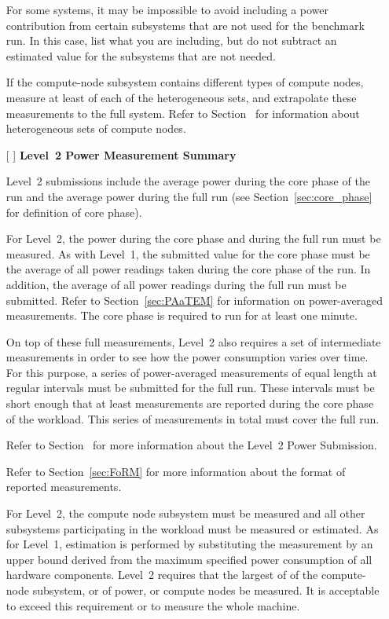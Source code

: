 \begin{itemize}
For some systems, it may be impossible to avoid including a power contribution from certain subsystems that are not used for the benchmark run.
In this case, list what you are including, but do not subtract an estimated value for the subsystems that are not needed.

If the compute-node subsystem contains different types of compute nodes, measure at least \SpecFracMinLOne{} of each of the heterogeneous sets, and extrapolate these measurements to the full system.
Refer to Section~ for information about heterogeneous sets of compute nodes.

\item[{[ ]}]
\textbf{Level~2 Power Measurement Summary}

Level~2 submissions include the average power during the core phase of the run and the average power during the full run (see Section~\ref{sec:core_phase} for definition of core phase).

For Level~2, the power during the core phase and during the full run must be measured.
As with Level~1, the submitted value for the core phase must be the average of all power readings taken during the core phase of the run.
In addition, the average of all power readings during the full run must be submitted.
Refer to Section~\ref{sec:PAaTEM} for information on power-averaged measurements.
The core phase is required to run for at least one minute.

On top of these full measurements, Level~2 also requires a set of intermediate measurements in order to see how the power consumption varies over time.
For this purpose, a series of power-averaged measurements of equal length at regular intervals must be submitted for the full run.
These intervals must be short enough that at least \MinMeasurementsCorePhaseLTwoThree{} measurements are reported during the core phase of the workload.
This series of measurements in total must cover the full run.

Refer to Section~ for more information about the Level~2 Power Submission.

Refer to Section~\ref{sec:FoRM} for more information about the format of reported measurements.

For Level~2, the compute node subsystem must be measured and all other subsystems participating in the workload must be measured or estimated.
As for Level~1, estimation is performed by substituting the measurement by an upper bound derived from the maximum specified power consumption of all hardware components.
Level~2 requires that the largest of \SpecFracMinLTwo{} of the compute-node subsystem, or \SpecPowerMinLTwo{} of power, or \SpecMinNodes{} compute nodes be measured.
It is acceptable to exceed this requirement or to measure the whole machine.


\end{itemize}
